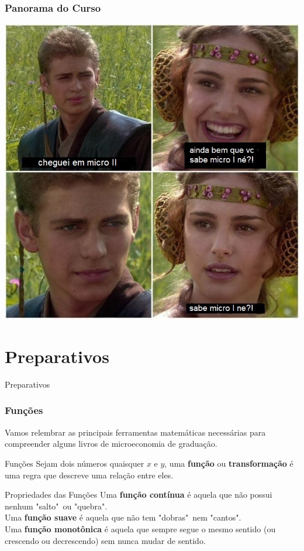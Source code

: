 \documentclass{beamer}[10]
\begin{document}
\begin{frame}
	\frametitle{Panorama do Curso}
	\begin{center}
		\includegraphics[scale=0.4]{img01.jpg}
	\end{center}
\end{frame}

\section{Preparativos}

\begin{frame}
	\Huge Preparativos
\end{frame}

\begin{frame}
	\frametitle{Funções}
	Vamos relembrar as principais ferramentas  matemáticas necessárias para compreender alguns livros de microeconomia de graduação.
	\begin{block}{Funções}
		Sejam dois números quaisquer $x$ e $y$, uma \textbf{função} ou \textbf{transformação} é uma regra que descreve uma relação entre eles.
	\end{block}

	\begin{block}{Propriedades das Funções}
		Uma \textbf{função contínua} é aquela que não possui nenhum "salto"\ ou "quebra".\\
		Uma \textbf{função suave} é aquela que não tem "dobras"\ nem "cantos".\\
		Uma \textbf{função monotônica} é aquela que sempre segue o mesmo sentido (ou crescendo ou decrescendo) sem nunca mudar de sentido.
	\end{block}
\end{frame}
\end{document}
